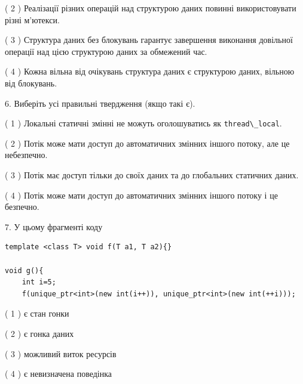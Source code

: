 \documentclass[12pt, ukrainian]{article}
\def\code#1{\Verb!#1!}
\begin{document}
\begin {large}
{( 2 ) Реалізації різних операцій над структурою даних повинні використовувати різні м’ютекси.%

( 3 ) Структура даних без блокувань гарантує завершення виконання довільної операції над цією структурою даних за обмежений час.%

( 4 ) Кожна вільна від очікувань структура даних є структурою даних, вільною від блокувань.%
\newpage



\vspace{5mm}
6. Виберіть усі правильні твердження (якщо такі є).\par
\vspace{2mm}

( 1 ) Локальні статичні змінні не можуть оголошуватись як \code{thread\_local}.%

( 2 ) Потік може мати доступ до автоматичних змінних іншого потоку, але це небезпечно.%

( 3 ) Потік має доступ тільки до своїх даних та до глобальних статичних даних.%

( 4 ) Потік може мати доступ до автоматичних змінних іншого потоку і це безпечно.%


\vspace{5mm}
7. У цьому фрагменті коду
\begin{verbatim}
template <class T> void f(T a1, T a2){}

void g(){
    int i=5;
    f(unique_ptr<int>(new int(i++)), unique_ptr<int>(new int(++i)));
\end{verbatim}

( 1 ) є стан гонки%

( 2 ) є гонка даних%

( 3 ) можливий виток ресурсів%

( 4 ) є невизначена поведінка%
}
\end {large}
\end{document}
